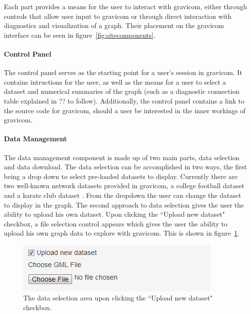 \documentclass{article}\usepackage[]{graphicx}\usepackage[]{color}
\newcommand{\ak}[1]{{\color{blue} #1}}
\begin{document}
Each part provides a means for the user to interact with gravicom, either through controls that allow user input to gravicom or through direct interaction with diagnostics and visualization of a graph. Their placement on the gravicom interface can be seen in figure~\ref{fig:sitecomponents}.

\paragraph{Control Panel}
The control panel serves as the starting point for a user's session in gravicom. It contains intructions for the user, as well as the means for a user to select a dataset and numerical summaries of the graph (such as a diagnostic connection table explained in \ak{??} to follow). Additionally, the control panel contains a link to the source code for gravicom, should a user be interested in the inner workings of gravicom.

\paragraph{Data Management}
The data management component is made up of two main parts, data selection and data download. The data selection can be accomplished in two ways, the first being a drop down to select pre-loaded datasets to display. Currently there are two well-known network datasets provided in gravicom, a college football dataset \cite{gn-football} and a karate club dataset \cite{zachary1977information}. From the dropdown the user can change the dataset to display in the graph. The second approach to data selection gives the user the ability to upload his own dataset. Upon clicking the ``Upload new dataset" checkbox, a file selection control appears which gives the user the ability to upload his own graph data to explore with gravicom. This is shown in figure~\ref{fig:uploadnewdataset}. 

\begin{figure}[H]
\centering
\includegraphics[]{images/uploadnewdataset.png}
\caption{\label{fig:uploadnewdataset} The data selection area upon clicking the ``Upload new dataset" checkbox.}
\end{figure}
\end{document}
